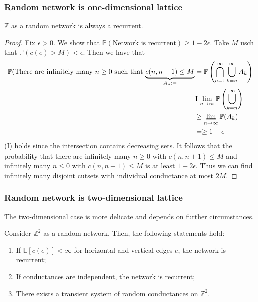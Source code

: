 \subsubsection{Random network is one-dimensional lattice}
\begin{thm}[]
    \(\mathbb{Z}\) as a random network is always a recurrent.
\end{thm}

\begin{proof}
  Fix \(\epsilon>0\). We show that \(\mathbb{P}(\text{Network is recurrent})\geq 1-2 \epsilon.\) Take \(M\) usch that \(\mathbb{P}(c(e) >M)< \epsilon\). Then we have that 
  \begin{align*}
    \mathbb{P}(\text{There are infinitely many \(n\geq 0\) such that \(\underbrace{c(n,n+1) \leq M}_{A_n:=}\)} &= \mathbb{P} \left(\bigcap_{n=1}^{\infty} \bigcup_{k=n}^{\infty } A_k\right) \\
                                                                                                         &\overset{=}{\text{I}}\lim_{n \to \infty} \mathbb{P} \left(\bigcup_{k=n}^{\infty }\right) \\
                                                                                                         &\geq\varliminf_{n \to \infty} \mathbb{P}(A_k) \\
                                                                                                         &= \geq 1- \epsilon
  \end{align*}
  (I) holds since the intersection contains decreasing sets. It follows that the probability that there are infinitely many \(n\geq 0\) with \(c(n,n+1) \leq M\) and infinitely many \(n \leq 0\) with \(c(n,n-1) \leq M\) is at least \(1- 2\epsilon\). Thus we can find infinitely many disjoint cutsets with individual conductance at most \(2M\).

\end{proof}

\subsubsection{Random network is two-dimensional lattice}
The two-dimensional case is more delicate and depends on further circumstances. 

\begin{thm}[]
    Consider \(\mathbb{Z}^2\) as a random network. Then, the following statements hold:
    \begin{enumerate}[1)]
      \item If \(\mathbb{E} \left[c(e)\right] < \infty \) for horizontal and vertical edges \(e\), the network is recurrent;
      \item If conductances are independent, the network is recurrent;
      \item There exists a transient system of random conductances on \(\mathbb{Z}^2\).
    \end{enumerate}
    
\end{thm}


